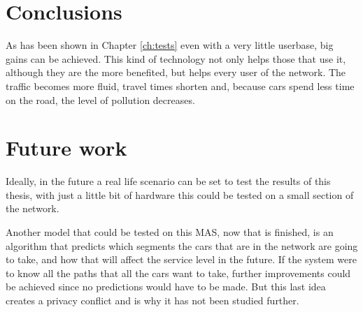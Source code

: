 \section{Conclusions}

As has been shown in Chapter \ref{ch:tests} even with a very little userbase, big gains can be achieved. This kind of technology not only helps those that use it, although they are the more benefited, but helps every user of the network. The traffic becomes more fluid, travel times shorten and, because cars spend less time on the road, the level of pollution decreases.

\section{Future work}

Ideally, in the future a real life scenario can be set to test the results of this thesis, with just a little bit of hardware this could be tested on a small section of the network.

Another model that could be tested on this MAS, now that is finished, is an algorithm that predicts which segments the cars that are in the network are going to take, and how that will affect the service level in the future. If the system were to know all the paths that all the cars want to take, further improvements could be achieved since no predictions would have to be made. But this last idea creates a privacy conflict and is why it has not been studied further.



